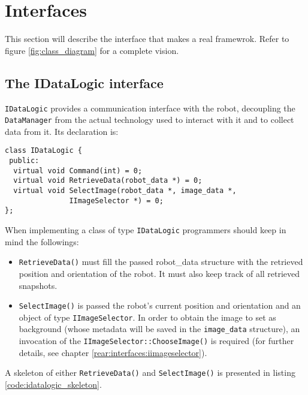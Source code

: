 \section{Interfaces}
\label{rear:interfaces}

This section will describe the interface that
makes \framework{} a real framewrok. Refer to figure
\ref{fig:class_diagram} for a complete vision.

\subsection{The IDataLogic interface}
\label{rear:interfaces:idatalogic}

\texttt{IDataLogic} provides a communication interface 
with the robot, decoupling the \texttt{DataManager} 
from the actual technology used to interact with it 
and to collect data from it. Its declaration is:
 
\begin{lstlisting}[caption={\texttt{IDataLogic} declaration}, label={code:idatalogic}, frame=trBL]
class IDataLogic {
 public:
  virtual void Command(int) = 0;
  virtual void RetrieveData(robot_data *) = 0;
  virtual void SelectImage(robot_data *, image_data *,
			   IImageSelector *) = 0;
};
\end{lstlisting}

When implementing a class of type \texttt{IDataLogic}
programmers should keep in mind the followings:

\begin{itemize}
  \item \texttt{RetrieveData()} must fill the passed 
    robot\_data structure with the retrieved position and
    orientation of the robot. It must also keep track of 
    all retrieved snapshots.
  \item \texttt{SelectImage()} is passed the robot's current 
    position and orientation and an object of type 
    \texttt{IImageSelector}. In order to obtain the image 
    to set as background (whose metadata will be saved 
    in the \texttt{image\_data} structure), an 
    invocation of the \texttt{IImageSelector::ChooseImage()}
    is required (for further details, see chapter
    \ref{rear:interfaces:iimageselector}).
\end{itemize}

A skeleton of either \texttt{RetrieveData()} and 
\texttt{SelectImage()} is presented in listing 
\ref{code:idatalogic_skeleton}.

